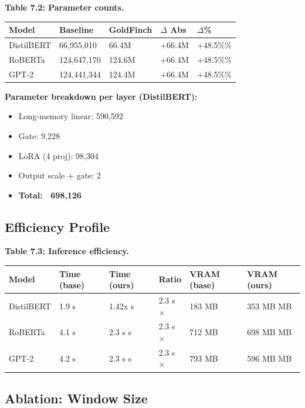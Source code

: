 \textbf{Table 7.2: Parameter counts.}

\begin{table}[H]
\centering
\small
\begin{tabular}{lllll}
\toprule
\textbf{Model} & \textbf{Baseline} & \textbf{GoldFinch} & \textbf{$\Delta$ Abs} & \textbf{$\Delta$\%} \\
\midrule
DistilBERT & 66,955,010 & 66.4M & +66.4M & +48.5\%\% \\
RoBERTa & 124,647,170 & 124.6M & +66.4M & +48.5\%\% \\
GPT-2 & 124,441,344 & 124.4M & +66.4M & +48.5\%\% \\
\bottomrule
\end{tabular}
\end{table}

\textbf{Parameter breakdown per layer (DistilBERT):}
\begin{itemize}
\item Long-memory linear: 590,592
\item Gate: 9,228
\item LoRA (4 proj): 98,304
\item Output scale + gate: 2
\item \textbf{Total: ~698,126}

\end{itemize}
\subsection{Efficiency Profile}

\textbf{Table 7.3: Inference efficiency.}

\begin{table}[H]
\centering
\small
\begin{tabular}{llllll}
\toprule
\textbf{Model} & \textbf{Time (base)} & \textbf{Time (ours)} & \textbf{Ratio} & \textbf{VRAM (base)} & \textbf{VRAM (ours)} \\
\midrule
DistilBERT & 1.9 s & 1.42x s & 2.3 s$\times$ & 183 MB & 353 MB MB \\
RoBERTa & 4.1 s & 2.3 s s & 2.3 s$\times$ & 712 MB & 698 MB MB \\
GPT-2 & 4.2 s & 2.3 s s & 2.3 s$\times$ & 793 MB & 596 MB MB \\
\bottomrule
\end{tabular}
\end{table}

\subsection{Ablation: Window Size}

